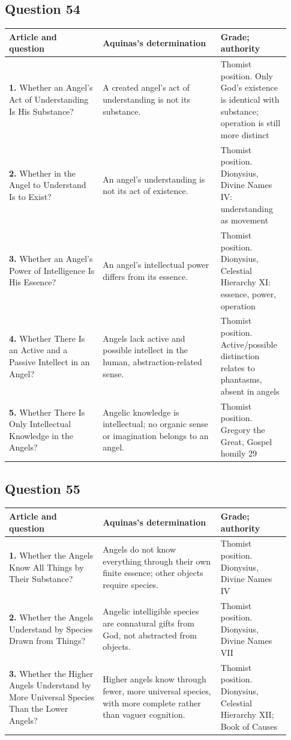 \subsection{Question 54}
\begin{longtable}{@{}>{\raggedright\arraybackslash}p{0.31\linewidth}>{\raggedright\arraybackslash}p{0.39\linewidth}>{\raggedright\arraybackslash}p{0.23\linewidth}@{}}
\toprule
Article and question & Aquinas's determination & Grade; authority\\
\midrule\endhead
\textbf{1.} Whether an Angel's Act of Understanding Is His Substance? & A created angel's act of understanding is not its substance. & Thomist position. Only God's existence is identical with substance; operation is still more distinct\\
\textbf{2.} Whether in the Angel to Understand Is to Exist? & An angel's understanding is not its act of existence. & Thomist position. Dionysius, Divine Names IV: understanding as movement\\
\textbf{3.} Whether an Angel's Power of Intelligence Is His Essence? & An angel's intellectual power differs from its essence. & Thomist position. Dionysius, Celestial Hierarchy XI: essence, power, operation\\
\textbf{4.} Whether There Is an Active and a Passive Intellect in an Angel? & Angels lack active and possible intellect in the human, abstraction-related sense. & Thomist position. Active/possible distinction relates to phantasms, absent in angels\\
\textbf{5.} Whether There Is Only Intellectual Knowledge in the Angels? & Angelic knowledge is intellectual; no organic sense or imagination belongs to an angel. & Thomist position. Gregory the Great, Gospel homily 29\\
\bottomrule
\end{longtable}
\subsection{Question 55}
\begin{longtable}{@{}>{\raggedright\arraybackslash}p{0.31\linewidth}>{\raggedright\arraybackslash}p{0.39\linewidth}>{\raggedright\arraybackslash}p{0.23\linewidth}@{}}
\toprule
Article and question & Aquinas's determination & Grade; authority\\
\midrule\endhead
\textbf{1.} Whether the Angels Know All Things by Their Substance? & Angels do not know everything through their own finite essence; other objects require species. & Thomist position. Dionysius, Divine Names IV\\
\textbf{2.} Whether the Angels Understand by Species Drawn from Things? & Angelic intelligible species are connatural gifts from God, not abstracted from objects. & Thomist position. Dionysius, Divine Names VII\\
\textbf{3.} Whether the Higher Angels Understand by More Universal Species Than the Lower Angels? & Higher angels know through fewer, more universal species, with more complete rather than vaguer cognition. & Thomist position. Dionysius, Celestial Hierarchy XII; Book of Causes\\
\bottomrule
\end{longtable}

